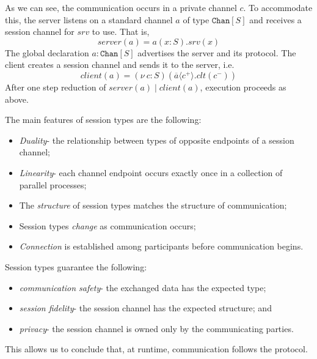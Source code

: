 \documentclass[a4paper, openany]{memoir}
\theoremstyle{definition}
\begin{document}
    As we can see, the communication occurs in a private channel $c$. To accommodate this, the server listens on a standard channel $a$ of type $\texttt{Chan}[S]$ and receives a session channel for $srv$ to use. That is,
    \[\textit{server}(a) = a(x \colon S).srv(x)\]
    The global declaration $a \colon \texttt{Chan}[S]$ advertises the server and its protocol. The client creates a session channel and sends it to the server, i.e.
    \[\textit{client}(a) = (\nu \ c \colon S)(\overline{a}\langle c^+ \rangle.clt(c^-))\]
    After one step reduction of $\textit{server}(a) \mid \textit{client}(a)$, execution proceeds as above.

    The main features of session types are the following:
    \begin{itemize}
        \item \emph{Duality}- the relationship between types of opposite endpoints of a session channel;
        \item \emph{Linearity}- each channel endpoint occurs exactly once in a collection of parallel processes;
        \item The \emph{structure} of session types matches the structure of communication;
        \item Session types \emph{change} as communication occurs;
        \item \emph{Connection} is established among participants before communication begins.
    \end{itemize}
    Session types guarantee the following:
    \begin{itemize}
        \item \emph{communication safety}- the exchanged data has the expected type;
        \item \emph{session fidelity}- the session channel has the expected structure; and
        \item \emph{privacy}- the session channel is owned only by the communicating parties.
    \end{itemize}
    This allows us to conclude that, at runtime, communication follows the protocol.
\end{document}
